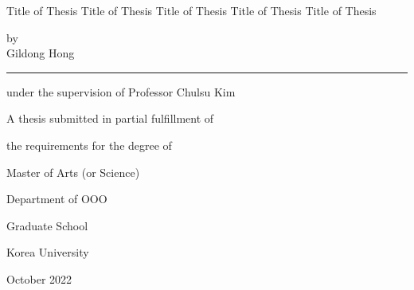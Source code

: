 \documentclass[11pt]{report}
\begin{document}

\newpage %
\begin{center}
\huge Title of Thesis Title of Thesis Title of Thesis Title of Thesis Title of Thesis  
\par\vspace{3cm} %
\Large by\\
Gildong Hong
\par\vspace{0.5cm}
\rule{.6\textwidth}{0.4pt} %
\par\vspace{0.7cm}
under the supervision of Professor Chulsu Kim
\par\vspace{0.7cm}
A thesis submitted in partial fulfillment of \par
the requirements for the degree of \par
Master of Arts (or Science)  
\par\vspace{10pt}
\Large Department of OOO %
\par\vspace{1.5cm}
\LARGE Graduate School 
\par\vspace{0.5cm}
\LARGE Korea University 
\par\vspace{1cm}
\large October 2022 %
\end{center}

\end{document}
